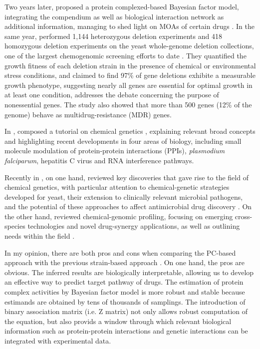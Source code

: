 \documentclass[12pt,fullpage,singlespace]{article}
\begin{document}
Two years later,  proposed a protein complexed-based Bayesian factor model, integrating the compendium as well as biological interaction network as additional information, managing to shed light on MOAs of certain drugs \citep{1079}. In the same year,  performed 1,144 heterozygous deletion experiments and 418 homozygous deletion experiments on the yeast whole-genome deletion collections, one of the largest chemogenomic screening efforts to date \citep{1080}. They quantified the growth fitness of each deletion strain in the presence of chemical or environmental stress conditions, and claimed to find 97\% of gene deletions exhibite a measurable growth phenotype, suggesting nearly all genes are essential for optimal growth in at least one condition, addresses the debate concerning the purpose of nonessential genes. The study also showed that more than 500 genes (12\% of the genome) behave as multidrug-resistance (MDR) genes.

In \citeyear{1103},  composed a tutorial on chemical genetics \citep{1103}, explaining relevant broad concepts and highlighting recent developments in four areas of biology, including small molecule modulation of protein-protein interactions (PPIs), \textit{plasmodium falciparum}, hepatitis C virus and RNA interference pathways.

Recently in \citeyear{1081}, on one hand,  reviewed key discoveries that gave rise to the field of chemical genetics, with particular attention to chemical-genetic strategies developed for yeast, their extension to clinically relevant microbial pathogens, and the potential of these approaches to affect antimicrobial drug discovery \citep{1081}. On the other hand,  reviewed chemical-genomic profiling, focusing on emerging cross-species technologies and novel drug-synergy applications, as well as outlining needs within the field \citep{1082}.

In my opinion, there are both pros and cons when comparing the PC-based approach \citep{1079} with the previous strain-based approach \citep{1078}. On one hand, the pros are obvious. The inferred results are biologically interpretable, allowing us to develop an effective way to predict target pathway of drugs. The estimation of protein complex activities by Bayesian factor model is more robust and stable because estimands are obtained by tens of thousands of samplings. The introduction of binary association matrix (i.e. Z matrix) not only allows robust computation of the equation, but also provids a window through which relevant biological information such as protein-protein interactions and genetic interactions can be integrated with experimental data.
\end{document}
